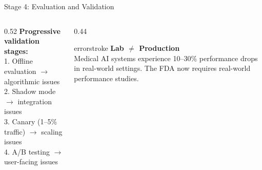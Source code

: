\documentclass[aspectratio=169, 12pt]{beamer}
\begin{document}
\begin{frame}{Stage 4: Evaluation and Validation}
\begin{columns}[T]
\begin{column}{0.52\textwidth}
    \vspace{0.1cm}
    \textbf{Progressive validation stages:}\\
    {\footnotesize
    1. Offline evaluation $\to$ algorithmic issues\\
    2. Shadow mode $\to$ integration issues\\
    3. Canary (1--5\% traffic) $\to$ scaling issues\\
    4. A/B testing $\to$ user-facing issues}
  \end{column}
  \begin{column}{0.44\textwidth}
    \begin{mlsyscard}{errorstroke}
    {\footnotesize \textbf{Lab $\neq$ Production}\\[0.1cm]
    Medical AI systems experience 10--30\% performance drops in real-world settings. The FDA now requires real-world performance studies.}
    \end{mlsyscard}

    \vspace{0.15cm}
  \end{column}
\end{columns}

\end{frame}
\end{document}
